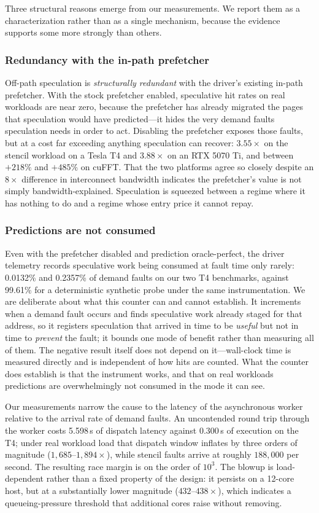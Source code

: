Three structural reasons emerge from our measurements. We report them as a
characterization rather than as a single mechanism, because the evidence
supports some more strongly than others.

\subsubsection*{Redundancy with the in-path prefetcher}
Off-path speculation is \emph{structurally redundant} with the driver's existing
in-path prefetcher. With the stock prefetcher enabled, speculative hit rates on
real workloads are near zero, because the prefetcher has already migrated the
pages that speculation would have predicted---it hides the very demand faults
speculation needs in order to act. Disabling the prefetcher exposes those
faults, but at a cost far exceeding anything speculation can recover:
$3.55\times$ on the stencil workload on a Tesla T4 and $3.88\times$ on an RTX
5070 Ti, and between $+218\%$ and $+485\%$ on cuFFT. That the two platforms
agree so closely despite an $8\times$ difference in interconnect bandwidth
indicates the prefetcher's value is not simply bandwidth-explained. Speculation
is squeezed between a regime where it has nothing to do and a regime whose entry
price it cannot repay.

\subsubsection*{Predictions are not consumed}
Even with the prefetcher disabled and prediction oracle-perfect, the driver
telemetry records speculative work being consumed at fault time only rarely:
0.0132\% and 0.2357\% of demand faults on our two T4 benchmarks, against
99.61\% for a deterministic synthetic probe under the same instrumentation. We
are deliberate about what this counter can and cannot establish. It increments
when a demand fault occurs and finds speculative work already staged for that
address, so it registers speculation that arrived in time to be \emph{useful}
but not in time to \emph{prevent} the fault; it bounds one mode of benefit
rather than measuring all of them. The negative result itself does not depend on
it---wall-clock time is measured directly and is independent of how hits are
counted. What the counter does establish is that the instrument works, and that
on real workloads predictions are overwhelmingly not consumed in the mode it can
see.

Our measurements narrow the cause to the latency of the asynchronous worker
relative to the arrival rate of demand faults. An uncontended round trip through
the worker costs 5.598\,\textmu s of dispatch latency against
0.300\,\textmu s of execution on the T4; under real workload load that
dispatch window inflates by three orders of magnitude ($1{,}685$--$1{,}894\times$),
while stencil faults arrive at roughly $188{,}000$ per second. The resulting race
margin is on the order of $10^3$. The blowup is load-dependent rather than a
fixed property of the design: it persists on a 12-core host, but at a
substantially lower magnitude ($432$--$438\times$), which indicates a queueing-pressure
threshold that additional cores raise without removing.

